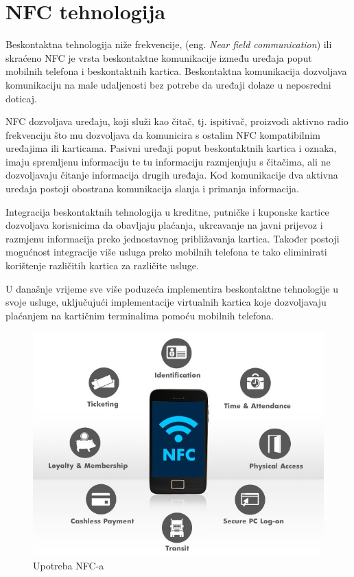 \documentclass[times, utf8, zavrsni]{fer}
\begin{document}
\chapter{NFC tehnologija}
Beskontaktna tehnologija niže frekvencije, (eng. \textit{Near field communication}) ili skraćeno NFC je vrsta beskontaktne komunikacije između uređaja poput mobilnih telefona i beskontaktnih kartica. Beskontaktna komunikacija dozvoljava komunikaciju na male udaljenosti bez potrebe da uređaji dolaze u neposredni doticaj. \par
NFC dozvoljava uređaju, koji služi kao čitač, tj. ispitivač, proizvodi aktivno radio frekvenciju što mu dozvoljava da komunicira s ostalim NFC kompatibilnim uređajima ili karticama. Pasivni uređaji poput beskontaktnih kartica i oznaka, imaju spremljenu informaciju te tu informaciju razmjenjuju s čitačima, ali ne dozvoljavaju čitanje informacija drugih uređaja. Kod komunikacije dva aktivna uređaja postoji obostrana komunikacija slanja i primanja informacija.\par 
Integracija beskontaktnih tehnologija u kreditne, putničke i kuponske kartice dozvoljava korisnicima da obavljaju plaćanja, ukrcavanje na javni prijevoz i razmjenu informacija preko jednostavnog  približavanja kartica. Također postoji mogućnost integracije više usluga preko mobilnih telefona te tako eliminirati korištenje različitih kartica za različite usluge.\par 
U današnje vrijeme sve više poduzeća implementira beskontaktne tehnologije u svoje usluge, uključujući implementacije virtualnih kartica koje dozvoljavaju plaćanjem na kartičnim terminalima pomoću mobilnih telefona.
\citep{1}

\begin{figure}[h]
\includegraphics[scale=0.4]{nfcuse.jpeg}
\centering
\caption[]{Upotreba NFC-a \citep{2}}
\centering
\end{figure}
\end{document}
